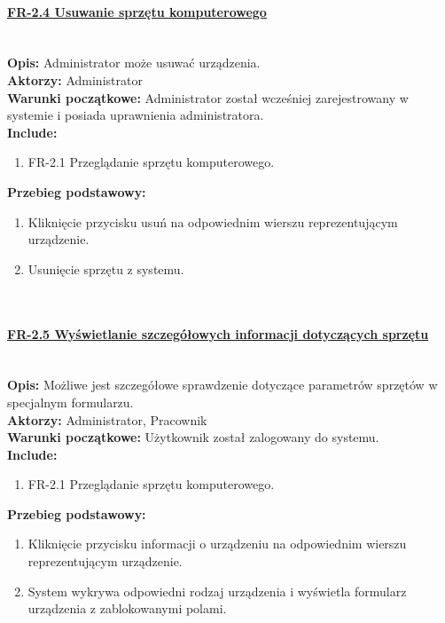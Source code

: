 \paragraph{\underline{FR-2.4 Usuwanie sprzętu komputerowego}}\mbox{}\\[1mm]
	\noindent\textbf{Opis:} Administrator może usuwać urządzenia.\\
	\noindent\textbf{Aktorzy:} Administrator\\
	\textbf{Warunki początkowe:} Administrator został wcześniej zarejestrowany w systemie i posiada uprawnienia administratora.\\
	\textbf{Include:} 
	\begin{enumerate}[noparskip]
		\item FR-2.1 Przeglądanie sprzętu komputerowego.
	\end{enumerate}
    \textbf{Przebieg podstawowy:}
	\begin{enumerate}[noparskip]
		\item Kliknięcie przycisku usuń na odpowiednim wierszu reprezentującym urządzenie.
		\item Usunięcie sprzętu z systemu.
  \end{enumerate} \mbox{}\\[-11mm]

\paragraph{\underline{FR-2.5 Wyświetlanie szczegółowych informacji dotyczących sprzętu}}\mbox{}\\[1mm]
	\noindent\textbf{Opis:} Możliwe jest szczegółowe sprawdzenie dotyczące parametrów sprzętów w specjalnym formularzu.\\
	\noindent\textbf{Aktorzy:} Administrator, Pracownik\\
	\textbf{Warunki początkowe:} Użytkownik został zalogowany do systemu.\\
	\textbf{Include:} 
	\begin{enumerate}[noparskip]
		\item FR-2.1 Przeglądanie sprzętu komputerowego.
	\end{enumerate}
  \textbf{Przebieg podstawowy:}
	\begin{enumerate}[noparskip]
		\item Kliknięcie przycisku informacji o urządzeniu na odpowiednim wierszu reprezentującym urządzenie.
		\item System wykrywa odpowiedni rodzaj urządzenia i wyświetla formularz urządzenia z zablokowanymi polami.
  \end{enumerate} \mbox{}\\[-11mm]

